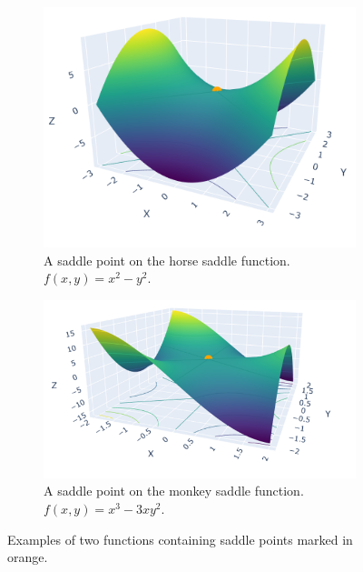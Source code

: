 \begin{figure}[h]

    \begin{subfigure}[b]{0.48\linewidth}

        \centering

        \includegraphics[width=0.8\linewidth]{figures/2background/horse_saddle.png}

        \caption{A saddle point on the horse saddle function. \\

        $f(x,y) = x^2 - y^2$.}

        \label{fig:horse_saddle}

    \end{subfigure}

    \hfill

    \begin{subfigure}[b]{0.48\linewidth}

        \centering

        \includegraphics[width=\linewidth]{figures/2background/monkey_saddle.png}

        \caption{A saddle point on the monkey saddle function. \\

        $f(x,y) = x^3 - 3xy^2$.}

        \label{fig:monkey_saddle}

    \end{subfigure}

    \caption{Examples of two functions containing saddle points marked in orange.}

    \label{fig:saddle_point}

\end{figure}



